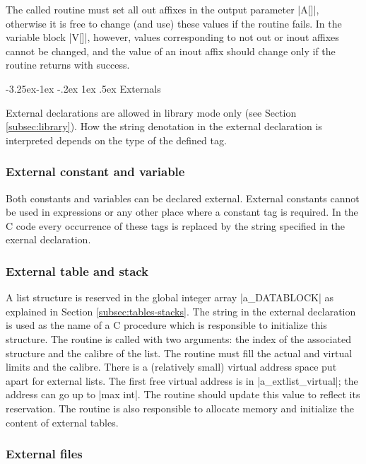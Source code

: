 \documentclass{article}
\makeatletter
\newcommand\g[1]{{\sf #1}}
\renewcommand\subsection{%
\@startsection{subsection}{2}{\z@}%
   {-3.25ex\@plus -1ex \@minus -.2ex}%
   {1ex \@plus .5ex}%
   {\normalfont\normalsize\bfseries}}
\makeatother
\begin{document}
\smallskip
\noindent
The called routine must set all out affixes in the output parameter
\pp|A[]|, otherwise it is free to change (and use) these values
if the routine fails. In the variable block \pp|V[]|, however,
values corresponding to not out or inout affixes
cannot be changed, and the value 
of an inout affix should change only if the routine returns with success.

\subsection{Externals}\label{subsec:externals}

External declarations are allowed in library mode only (see Section
\ref{subsec:library}). How the \g{string denotation} in the external declaration
is interpreted depends on the type of the defined tag.

\subsubsection{External constant and variable}

Both constants and variables can be declared \g{external}. External constants cannot
be used in expressions or any other place where a constant tag is required.
In the {\sf C} code every occurrence of these tags is replaced by the
string specified in the \g{exernal declaration}.

\subsubsection{External table and stack}

A list structure is reserved in the global integer array \pp|a\_DATABLOCK|
as explained in Section \ref{subsec:tables-stacks}. The string in the
external declaration is used as the name of a {\sf C} procedure which is
responsible to initialize this structure. The routine is called with two
arguments: the index of the associated structure and the calibre of the
list. The routine must fill the actual and virtual limits and the calibre.
There is a (relatively small) virtual address space put apart for external
lists. The first free virtual address is in \pp|a\_extlist\_virtual|; the
address can go up to \pp|max int|. The routine should update this value to
reflect its reservation. The routine is also responsible to allocate memory
and initialize the content of external tables.

\subsubsection{External files}
\end{document}

